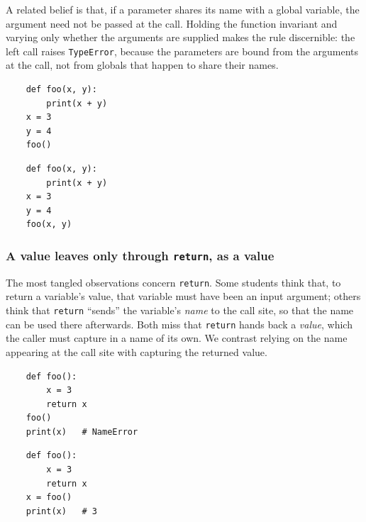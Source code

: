 A related belief is that, if a parameter shares its name with a global variable,
the argument need not be passed at the call. Holding the function invariant and
varying only whether the arguments are supplied makes the rule discernible: the
left call raises \texttt{TypeError}, because the parameters are bound
from the arguments at the call, not from globals that happen to share their
names.

\hfill
\begin{minipage}[t]{0.45\columnwidth}
  \begin{verbatim}
    def foo(x, y):
        print(x + y)
    x = 3
    y = 4
    foo()
  \end{verbatim}
\end{minipage}
\hfill
\begin{minipage}[t]{0.45\columnwidth}
  \begin{verbatim}
    def foo(x, y):
        print(x + y)
    x = 3
    y = 4
    foo(x, y)
  \end{verbatim}
\end{minipage}

\subsubsection{A value leaves only through \texttt{return}, as a value}

The most tangled observations concern \texttt{return}. Some students
think that, to return a variable's value, that variable must have been an input
argument; others think that \texttt{return} \enquote{sends} the
variable's \emph{name} to the call site, so that the name can be used there
afterwards. Both miss that \texttt{return} hands back a \emph{value},
which the caller must capture in a name of its own. We contrast relying on the
name appearing at the call site with capturing the returned value.

\hfill
\begin{minipage}[t]{0.45\columnwidth}
  \begin{verbatim}
    def foo():
        x = 3
        return x
    foo()
    print(x)   # NameError
  \end{verbatim}
\end{minipage}
\hfill
\begin{minipage}[t]{0.45\columnwidth}
  \begin{verbatim}
    def foo():
        x = 3
        return x
    x = foo()
    print(x)   # 3
  \end{verbatim}
\end{minipage}

